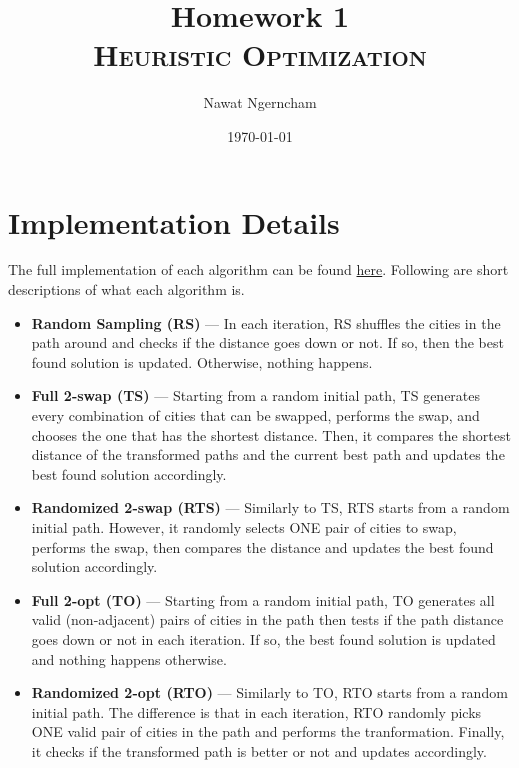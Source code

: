 \documentclass{article}
\title{\Huge{Homework 1}
	\\
	\Large\scshape{Heuristic Optimization}}
\author{Nawat Ngerncham}
\date{\today}
\begin{document}
\maketitle
	
\section{Implementation Details}

The full implementation of each algorithm can be found \hyperlink{https://github.com/nngerncham/ma395_heuristic/tree/main/homework/hw1/tsp_algorithms}{here}. Following are short descriptions of what each algorithm is.

\begin{itemize}
    \item \textbf{Random Sampling (RS)} ---
        In each iteration, RS shuffles the cities in the path around and checks if the distance goes down or not. If so, then the best found solution is updated. Otherwise, nothing happens.

    \item \textbf{Full 2-swap (TS)} ---
        Starting from a random initial path, TS generates every combination of cities that can be swapped, performs the swap, and chooses the one that has the shortest distance. Then, it compares the shortest distance of the transformed paths and the current best path and updates the best found solution accordingly.
    \item \textbf{Randomized 2-swap (RTS)} ---
        Similarly to TS, RTS starts from a random initial path. However, it randomly selects ONE pair of cities to swap, performs the swap, then compares the distance and updates the best found solution accordingly.

    \item \textbf{Full 2-opt (TO)} --- 
        Starting from a random initial path, TO generates all valid (non-adjacent) pairs of cities in the path then tests if the path distance goes down or not in each iteration. If so, the best found solution is updated and nothing happens otherwise.
    \item \textbf{Randomized 2-opt (RTO)} --- 
        Similarly to TO, RTO starts from a random initial path. The difference is that in each iteration, RTO randomly picks ONE valid pair of cities in the path and performs the tranformation. Finally, it checks if the transformed path is better or not and updates accordingly.
\end{itemize}
\end{document}
